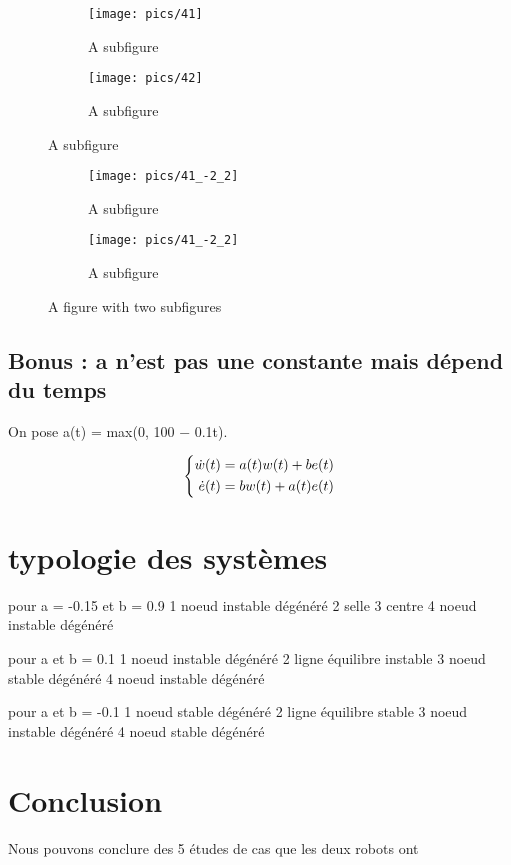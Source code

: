 \documentclass[utf8]{article}
\begin{document}
\begin{figure}
\centering
\begin{subfigure}{.5\textwidth}
  \centering
  \texttt{[image: pics/41]}
  \caption{A subfigure}
\end{subfigure}%
\begin{subfigure}{.5\textwidth}
  \centering
  \texttt{[image: pics/42]}
  \caption{A subfigure}
\end{subfigure}
\end{figure}

\begin{figure}
\centering
  \begin{subfigure}{.5\textwidth}
  \centering
  \texttt{[image: pics/41\_-2\_2]}
  \caption{A subfigure}
\end{subfigure}%
\begin{subfigure}{.5\textwidth}
  \centering
  \texttt{[image: pics/41\_-2\_2]}
  \caption{A subfigure}
\end{subfigure}
\caption{A figure with two subfigures}
\end{figure}

\newpage

\subsection{Bonus : a n’est pas une constante mais dépend du temps}

On pose a(t) = max(0, 100 − 0.1t).

\begin{equation}
\centering
\left\{\begin{split}
\dot{w}(t) &= a(t)w(t) + be(t)\\
\dot{e}(t) &= bw(t) + a(t)e(t) \\
\end{split}\right.
 \end{equation}

\section{typologie des systèmes}
pour a = -0.15 et b = 0.9
1 noeud instable dégénéré
2 selle
3 centre
4 noeud instable dégénéré

pour a et b = 0.1
1 noeud instable dégénéré
2 ligne équilibre instable
3 noeud stable dégénéré
4 noeud instable dégénéré

pour a et b = -0.1
1 noeud stable dégénéré
2 ligne équilibre stable
3 noeud instable dégénéré
4 noeud stable dégénéré

\newpage
\section{Conclusion}
Nous pouvons conclure des 5 études de cas que les deux robots ont
\end{document}
